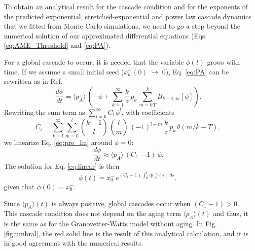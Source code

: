 To obtain an analytical result for the cascade condition and for the exponents of the predicted exponential, stretched-exponential and power law cascade dynamics that we fitted from Monte Carlo simulations, we need to go a step beyond the numerical solution of our approximated differential equations (Eqs. \eqref{eq:AME_Threshold} and \eqref{eq:PA}). 

For a global cascade to occur, it is needed that the variable $\phi(t)$ grows with time. If we assume a small initial seed ($x^{-}_{k} (0) \; \to \; 0$), Eq. \eqref{eq:PA} can be rewritten as in Ref. \cite{gleeson-2007}
\begin{equation} %
    \label{eq:pre_lin}
    \frac{d \phi}{dt}  = \langle p_A \rangle \, \left( -\phi + \sum_{k=1}^{\infty} \frac{k}{z} \, p_k \, \sum_{m = k\, T}^{k} B_{k-1,m} [\phi] \right).
\end{equation}
Rewriting the sum term as $\sum_{l=0}^{\infty} C_l \, \phi^l$, with coefficients 
\begin{equation}
    \label{eq:coef_phi}
    C_l = \sum_{k=l}^{\infty} \sum_{m=0}^{l} { k-1 \choose l} \, {l \choose m} \, (-1)^{l+m} \, \frac{k}{z} \, p_k \, \theta\left(m/k - T \right),
\end{equation}
we linearize Eq. \eqref{eq:pre_lin} around $\phi = 0$:
\begin{equation}
    \label{eq:linear}
    \frac{d \phi}{dt} \approx  \langle p_A \rangle \, ( C_1 -1) \, \phi.
\end{equation}
The solution for Eq. \eqref{eq:linear} is then
\begin{equation}
    \label{eq:phi_general}
    \phi(t) = x^{-}_{0}\,  e^{(C_1 - 1) \, \int_0^t \langle p_A \rangle (s) \, ds},
\end{equation}
given that $ \phi(0) = x^{-}_{0}$.

Since $\langle p_A \rangle(t)$ is always positive, global cascades occur when $( C_1 - 1) > 0 $. This cascade condition does not depend on the aging term $\langle p_A \rangle(t)$ and thus, it is the same as for the Granovetter-Watts model without aging. In Fig. \ref{fig:umbral}, the red solid line is the result of this analytical calculation, and it is in good agreement with the numerical results. 


